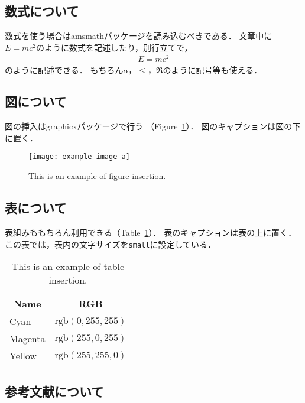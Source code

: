 \documentclass[uplatex, dvipdfmx, fonts=default]{acproceedings}
\begin{document}
\subsection{数式について}

数式を使う場合は\textsf{amsmath}パッケージを読み込むべきである．
文章中に$E=mc^2$のように数式を記述したり，別行立てで，
\begin{align}
	E = mc^2
\end{align}
のように記述できる．
もちろん$\alpha$，$\leq$，$\Re$のように記号等も使える．

\subsection{図について}

図の挿入は\textsf{graphicx}パッケージで行う
（Figure~\ref{fig:sample}）．
図のキャプションは図の下に置く．

\begin{figure}[b]
	\centering
	\texttt{[image: example-image-a]}
	\caption{This is an example of figure insertion.}
	\label{fig:sample}
\end{figure}

\subsection{表について}

表組みももちろん利用できる（Table~\ref{tbl:sample}）．
表のキャプションは表の上に置く．
この表では，表内の文字サイズを\texttt{small}に設定している．

\begin{table}[b!]
	\centering\small
	\caption{This is an example of table insertion.}
	\label{tbl:sample}
	\begin{tabular}{ll}
		\hline\hline
		\multicolumn{1}{c}{Name} &
		\multicolumn{1}{c}{RGB} \\\hline
		Cyan    & $\mathrm{rgb}(0, 255, 255)$ \\
		Magenta & $\mathrm{rgb}(255, 0, 255)$ \\
		Yellow  & $\mathrm{rgb}(255, 255, 0)$ \\\hline
	\end{tabular}
\end{table}

\subsection{参考文献について}
\end{document}
